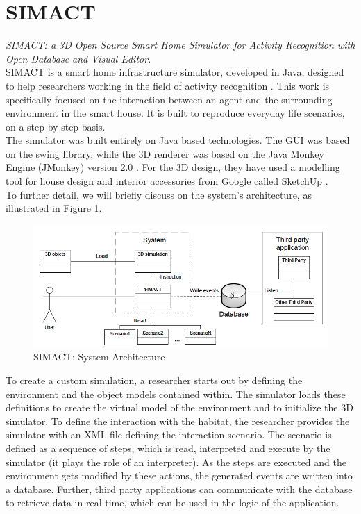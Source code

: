 \section{SIMACT}\label{sec:simact}
\emph{SIMACT: a 3D Open Source Smart Home Simulator for Activity Recognition with Open Database and Visual Editor.}\\

SIMACT is a smart home infrastructure simulator, developed in Java, designed to help researchers working in the field of activity recognition \cite{bouchard2012simact}. This work is specifically focused on the interaction between an agent and the surrounding environment in the smart house. It is built to reproduce everyday life scenarios, on a step-by-step basis.\\

The simulator was built entirely on Java based technologies. The GUI was based on the swing library, while the 3D renderer was based on the Java Monkey Engine (JMonkey) version 2.0 \cite{jme:online}. For the 3D design, they have used a modelling tool for house design and interior accessories from Google called SketchUp \cite{sketchup:online}.\\

To further detail, we will briefly discuss on the system's architecture, as illustrated in Figure \ref{fig:simact_architecture}.

\begin{figure}[H]
	\centering
	\includegraphics[width=\linewidth]{gfx/Chapter2/simact_architecture}
	\caption{SIMACT: System Architecture}
	\label{fig:simact_architecture}
\end{figure}

To create a custom simulation, a researcher starts out by defining the environment and the object models contained within. The simulator loads these definitions to create the virtual model of the environment and to initialize the 3D simulator. To define the interaction with the habitat, the researcher provides the simulator with an XML file defining the interaction scenario. The scenario is defined as a sequence of steps, which is read, interpreted and execute by the simulator (it plays the role of an interpreter). As the steps are executed and the environment gets modified by these actions, the generated events are written into a database. Further, third party applications can communicate with the database to retrieve data in real-time, which can be used in the logic of the application.\\

